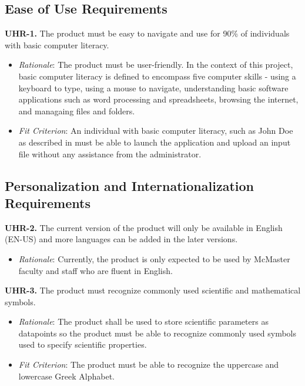 \documentclass[12pt]{article}
\begin{document}
\subsection{Ease of Use Requirements}
\textbf{UHR-1.} The product must be easy to navigate and use for 90\% of individuals with basic computer literacy.
\begin{itemize}
  \item \emph{Rationale}: The product must be user-friendly. In the context of this project, basic computer literacy is defined to encompass five computer skills - using a keyboard
  to type, using a mouse to navigate, understanding basic software applications such as word processing and spreadsheets, browsing the internet, and managaing files and folders.
  \item \emph{Fit Criterion}: An individual with basic computer literacy, such as John Doe as described in  must be able to launch the application and upload an input file
  without any assistance from the administrator.
\end{itemize}

\subsection{Personalization and Internationalization Requirements}
\textbf{UHR-2.} The current version of the product will only be available in English (EN-US) and more languages can be added in the later versions.
\begin{itemize}
  \item \emph{Rationale}: Currently, the product is only expected to be used by McMaster faculty and staff who are fluent in English.
\end{itemize}
\bigskip
\textbf{UHR-3.} The product must recognize commonly used scientific and mathematical symbols.
\begin{itemize}
  \item \emph{Rationale}: The product shall be used to store scientific parameters as datapoints so the product must be able to recognize commonly used symbols used to specify scientific properties.
  \item \emph{Fit Criterion}: The product must be able to recognize the uppercase and lowercase Greek Alphabet.
\end{itemize}
\end{document}
